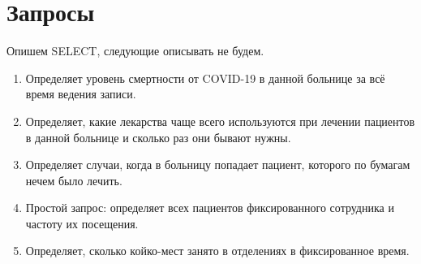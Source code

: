 \documentclass[12pt]{article}
\begin{document}
	\section{Запросы}
	
	Опишем SELECT, следующие описывать не будем.
	\begin{enumerate}
		\item Определяет уровень смертности от COVID-19 в данной больнице за всё время ведения записи.
		\item Определяет, какие лекарства чаще всего используются при лечении пациентов в данной больнице и сколько раз они бывают нужны.
		\item Определяет случаи, когда в больницу попадает пациент, которого по бумагам нечем было лечить.
		\item Простой запрос: определяет всех пациентов фиксированного сотрудника и частоту их посещения.
		\item Определяет, сколько койко-мест занято в отделениях в фиксированное время.
	\end{enumerate}
	
\end{document}
